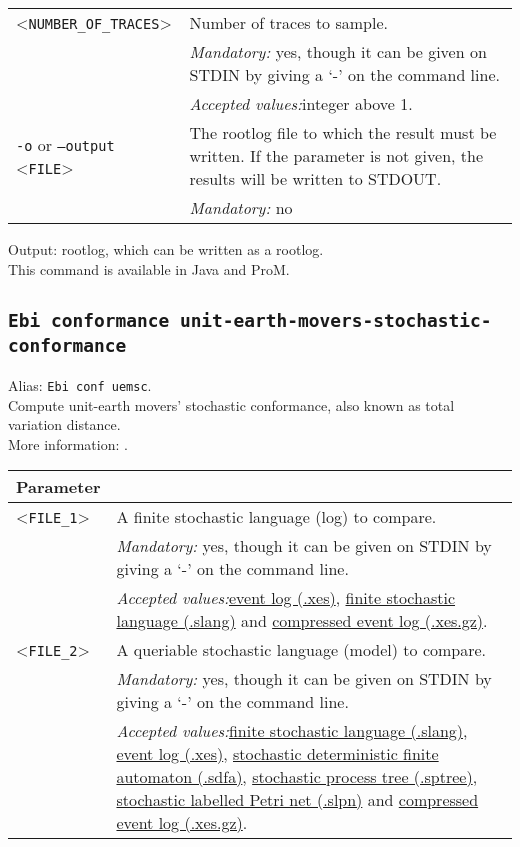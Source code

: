 {\begin{tabularx}{\linewidth}{lX}
<\texttt{NUMBER\_OF\_TRACES}>&Number of traces to sample.\\
&\textit{Mandatory:} \quad yes, though it can be given on STDIN by giving a `-' on the command line.\\
&\textit{Accepted values:}\quad integer above 1.\\
\texttt{-o} or \texttt{--output} <\texttt{FILE}> &
The rootlog file to which the result must be written. If the parameter is not given, the results will be written to STDOUT.\\
&\textit{Mandatory:} \quad no\\
\bottomrule
\end{tabularx}
\noindent Output: rootlog, which can be written as a rootlog.
\\This command is available in Java and ProM.
\subsection{\texttt{Ebi conformance unit-earth-movers-stochastic-conformance}}
\label{command:Ebi conformance unit-earth-movers-stochastic-conformance}
Alias: \texttt{Ebi conf uemsc}.\\
Compute unit-earth movers' stochastic conformance, also known as total variation distance.\\
More information: \cite{DBLP:conf/bpm/LeemansSA19}.\\
\begin{tabularx}{\linewidth}{lX}
\toprule
Parameter \\\midrule
<\texttt{FILE\_1}>&A finite stochastic language (log) to compare.\\
&\textit{Mandatory:} \quad yes, though it can be given on STDIN by giving a `-' on the command line.\\
&\textit{Accepted values:}\quad \hyperref[filehandler:event log]{event log (.xes)}, \hyperref[filehandler:finite stochastic language]{finite stochastic language (.slang)} and \hyperref[filehandler:compressed event log]{compressed event log (.xes.gz)}.\\
<\texttt{FILE\_2}>&A queriable stochastic language (model) to compare.\\
&\textit{Mandatory:} \quad yes, though it can be given on STDIN by giving a `-' on the command line.\\
&\textit{Accepted values:}\quad \hyperref[filehandler:finite stochastic language]{finite stochastic language (.slang)}, \hyperref[filehandler:event log]{event log (.xes)}, \hyperref[filehandler:stochastic deterministic finite automaton]{stochastic deterministic finite automaton (.sdfa)}, \hyperref[filehandler:stochastic process tree]{stochastic process tree (.sptree)}, \hyperref[filehandler:stochastic labelled Petri net]{stochastic labelled Petri net (.slpn)} and \hyperref[filehandler:compressed event log]{compressed event log (.xes.gz)}.\\

\end{tabularx}}
